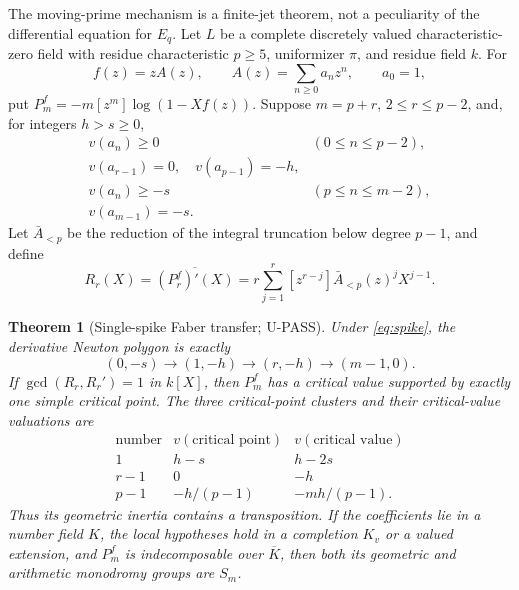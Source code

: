 \documentclass[11pt]{article}
\theoremstyle{keio}
\newtheorem{theorem}{Theorem}[section]
\theoremstyle{definition}
\theoremstyle{remark}
\newcommand{\UPASS}{\textcolor{keiogreen}{\textsf{U-PASS}}}
\begin{document}
The moving-prime mechanism is a finite-jet theorem, not a peculiarity of
the differential equation for $E_q$. Let $L$ be a complete discretely
valued characteristic-zero field with residue characteristic $p\ge5$,
uniformizer $\pi$, and residue field $k$. For
\[
f(z)=zA(z),\qquad A(z)=\sum_{n\ge0}a_nz^n,\qquad a_0=1,
\]
put $P_m^f=-m[z^m]\log(1-Xf(z))$. Suppose $m=p+r$,
$2\le r\le p-2$, and, for integers $h>s\ge0$,
\begin{equation}
\begin{array}{ll}
v(a_n)\ge0 &(0\le n\le p-2),\\
v(a_{r-1})=0,\quad v(a_{p-1})=-h,\\
v(a_n)\ge-s &(p\le n\le m-2),\\
v(a_{m-1})=-s.
\end{array}
\label{eq:spike}
\end{equation}
Let $\bar A_{<p}$ be the reduction of the integral truncation below
degree $p-1$, and define
\begin{equation}
R_r(X)=\overline{(P_r^f)'(X)}
=r\sum_{j=1}^r[z^{r-j}]\bar A_{<p}(z)^jX^{j-1}.
\label{eq:R-general}
\end{equation}

\begin{theorem}[Single-spike Faber transfer; \UPASS]\label{thm:transfer}
Under \eqref{eq:spike}, the derivative Newton polygon is exactly
\begin{equation}
(0,-s)\longrightarrow(1,-h)\longrightarrow(r,-h)
\longrightarrow(m-1,0).
\label{eq:spike-NP}
\end{equation}
If $\gcd(R_r,R_r')=1$ in $k[X]$, then $P_m^f$ has a critical value
supported by exactly one simple critical point. The three critical-point
clusters and their critical-value valuations are
\begin{equation}
\begin{array}{c|c|c}
\text{number}&v(\text{critical point})&v(\text{critical value})\\ \hline
1&h-s&h-2s\\
r-1&0&-h\\
p-1&-h/(p-1)&-mh/(p-1).
\end{array}
\label{eq:cluster-table}
\end{equation}
Thus its geometric inertia contains a transposition. If the coefficients
lie in a number field $K$, the local hypotheses hold in a completion $K_v$
or a valued extension, and $P_m^f$ is indecomposable over $\overline K$,
then both its geometric and arithmetic monodromy groups are $S_m$.
\end{theorem}
\end{document}
